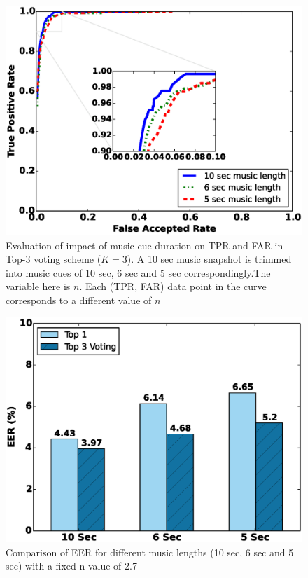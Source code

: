 \begin{figure}[t]
\centering
\includegraphics [width=\columnwidth]{figure/top3_roc.eps}
\caption{Evaluation of impact of music cue duration on TPR and FAR in Top-3
voting scheme ($K = 3$). A 10 sec music snapshot is trimmed into music cues of
10 sec, 6 sec and 5 sec correspondingly.The variable here is $n$. Each (TPR, FAR) data point in the curve corresponds to a different value of $n$}
\label{fig:roc-top3}
\end{figure}

\begin{figure}[t]
\centering
\includegraphics [width=\columnwidth]{figure/exp2_vary_length.eps}
\caption{Comparison of EER for different music lengths (10 sec, 6 sec and 5
sec) with a fixed n value of 2.7}
\label{fig:eer-length}
\end{figure}

